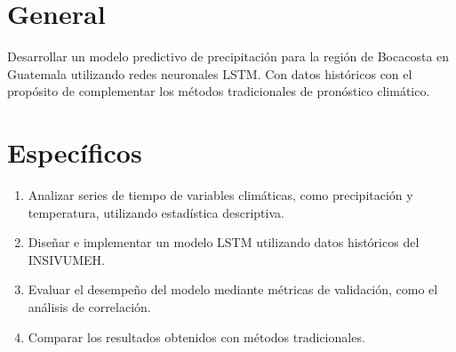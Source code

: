 \section{General}
\label{sec:general}

Desarrollar un modelo predictivo de precipitación para la región de Bocacosta en Guatemala utilizando redes neuronales LSTM. Con datos históricos con el propósito de complementar los métodos tradicionales de pronóstico climático. 

\section{Específicos}
\label{sec:especificos}

\begin{enumerate}
    \item Analizar series de tiempo de variables climáticas, como precipitación y temperatura, utilizando estadística descriptiva. 
    \item Diseñar e implementar un modelo LSTM utilizando datos históricos del INSIVUMEH.
    \item Evaluar el desempeño del modelo mediante métricas de validación, como el análisis de correlación.
    \item Comparar los resultados obtenidos con métodos tradicionales.
\end{enumerate}
